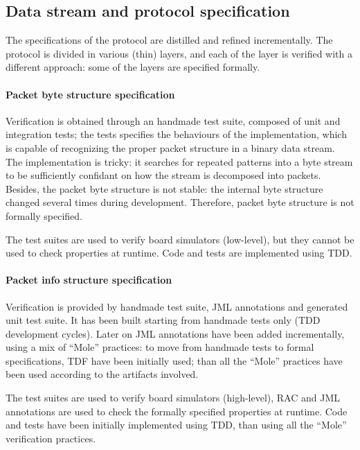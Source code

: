\documentclass[english]{lni}
\begin{document}
\subsection{Data stream and protocol specification}
\label{subsec:data_stream_and_protocol_specification}

The specifications of the protocol are distilled and refined incrementally.
The protocol is divided in various (thin) layers, and each of the layer is verified with a different approach: some of the layers are specified formally. 

\paragraph*{Packet byte structure specification}

Verification is obtained through an handmade test suite, composed of unit and integration tests; the tests specifies the behaviours of the implementation, which is capable of recognizing the proper packet structure in a binary data stream. 
The implementation is tricky: it searches for repeated patterns into a byte stream to be sufficiently confidant on how the stream is decomposed into packets.
Besides, the packet byte structure is not stable: the internal byte structure changed several times during development.
Therefore, packet byte structure is not formally specified.

The test suites are used to verify board simulators (low-level), but they cannot be used to check properties at runtime.
Code and tests are implemented using TDD.

\paragraph*{Packet info structure specification}

Verification is provided by handmade test suite, JML annotations and generated unit test suite. 
It has been built starting from handmade tests only (TDD development cycles).
Later on JML annotations have been added incrementally, using a mix of ``Mole'' practices: to move from handmade tests to formal specifications, TDF have been initially used; than all the ``Mole'' practices have been used according to the artifacts involved.

The test suites are used to verify board simulators (high-level), RAC and JML annotations are used to check the formally specified properties at runtime.
Code and tests have been initially implemented using TDD, than using all the ``Mole'' verification practices.
\end{document}
